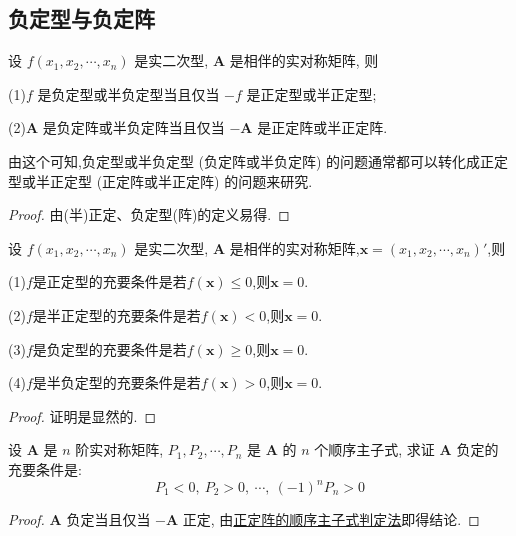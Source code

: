 \documentclass[../../main.tex]{subfiles}%
\begin{document}
\subsection{负定型与负定阵}

\begin{theorem}\label{theorem:负定阵或半负定阵的充要条件(与正定差一个负号)}
设 \(f(x_1,x_2,\cdots,x_n)\) 是实二次型, \(\boldsymbol{A}\) 是相伴的实对称矩阵, 则

(1)\(f\) 是负定型或半负定型当且仅当 \(-f\) 是正定型或半正定型;

(2)\(\boldsymbol{A}\) 是负定阵或半负定阵当且仅当 \(-\boldsymbol{A}\) 是正定阵或半正定阵.
\end{theorem}
\begin{remark}
由这个可知,负定型或半负定型 (负定阵或半负定阵) 的问题通常都可以转化成正定型或半正定型 (正定阵或半正定阵) 的问题来研究. 
\end{remark}
\begin{proof}

由(半)正定、负定型(阵)的定义易得.

\end{proof}

\begin{lemma}\label{lemma:(半)正/负定阵/型的等价条件}
设 \(f(x_1,x_2,\cdots,x_n)\) 是实二次型, \(\boldsymbol{A}\) 是相伴的实对称矩阵,$\boldsymbol{x}=(x_1,x_2,\cdots,x_n)'$,则

(1)$f$是正定型的充要条件是若$f(\boldsymbol{x})\leqslant  0$,则$\boldsymbol{x}=0$.

(2)$f$是半正定型的充要条件是若$f(\boldsymbol{x})< 0$,则$\boldsymbol{x}=0$.

(3)$f$是负定型的充要条件是若$f(\boldsymbol{x})\geqslant  0$,则$\boldsymbol{x}=0$.

(4)$f$是半负定型的充要条件是若$f(\boldsymbol{x})> 0$,则$\boldsymbol{x}=0$.
\end{lemma}
\begin{proof}

证明是显然的.

\end{proof}

\begin{proposition}\label{proposition:负定阵的判定准则1}
设 \(\boldsymbol{A}\) 是 \(n\) 阶实对称矩阵, \(P_1,P_2,\cdots,P_n\) 是 \(\boldsymbol{A}\) 的 \(n\) 个顺序主子式, 求证 \(\boldsymbol{A}\) 负定的充要条件是:
\[P_1<0,\ P_2>0,\ \cdots,\ (-1)^nP_n>0\]
\end{proposition}
\begin{proof}

\(\boldsymbol{A}\) 负定当且仅当 \(-\boldsymbol{A}\) 正定, 由\hyperref[theorem:实正定阵的充要条件]{正定阵的顺序主子式判定法}即得结论. 

\end{proof}
\end{document}
